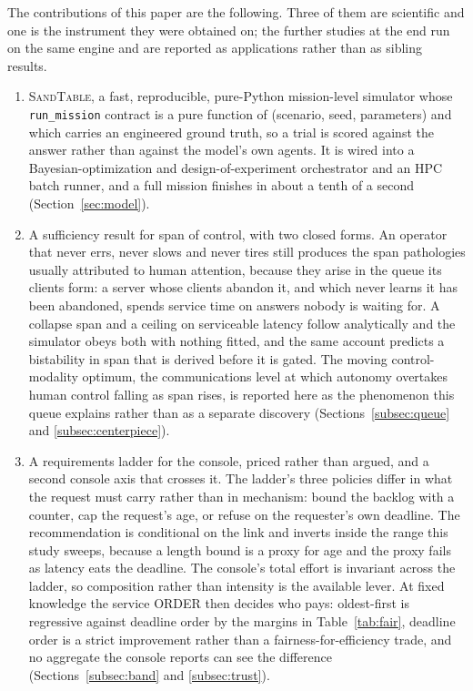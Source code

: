 \documentclass[11pt]{article}
\newcommand{\sandtable}{\textsc{SandTable}}
\begin{document}
The contributions of this paper are the following. Three of them are scientific and one is the
instrument they were obtained on; the further studies at the end run on the same engine and are
reported as applications rather than as sibling results.
\begin{enumerate}
\item \sandtable{}, a fast, reproducible, pure-Python mission-level simulator whose
\texttt{run\_mission} contract is a pure function of (scenario, seed, parameters) and which carries
an engineered ground truth, so a trial is scored against the answer rather than against the model's
own agents. It is wired into a Bayesian-optimization and design-of-experiment orchestrator and an
HPC batch runner, and a full mission finishes in about a tenth of a second
(Section~\ref{sec:model}).

\item A sufficiency result for span of control, with two closed forms. An operator that never errs,
never slows and never tires still produces the span pathologies usually attributed to human
attention, because they arise in the queue its clients form: a server whose clients abandon it, and
which never learns it has been abandoned, spends service time on answers nobody is waiting for. A
collapse span and a ceiling on serviceable latency follow analytically and the simulator obeys both
with nothing fitted, and the same account predicts a bistability in span that is derived before it
is gated. The moving control-modality optimum, the communications level at which autonomy overtakes
human control falling as span rises, is reported here as the phenomenon this queue explains rather
than as a separate discovery (Sections~\ref{subsec:queue} and \ref{subsec:centerpiece}).

\item A requirements ladder for the console, priced rather than argued, and a second console axis
that crosses it. The ladder's three policies differ in what the request must carry rather than in
mechanism: bound the backlog with a counter, cap the request's age, or refuse on the requester's own
deadline. The recommendation is conditional on the link and inverts inside the range this study
sweeps, because a length bound is a proxy for age and the proxy fails as latency eats the deadline.
The console's total effort is invariant across the ladder, so composition rather than intensity is
the available lever. At fixed knowledge the service ORDER then decides who pays: oldest-first is
regressive against deadline order by the margins in Table~\ref{tab:fair}, deadline order is a strict
improvement rather than a fairness-for-efficiency trade, and no aggregate the console reports can
see the difference (Sections~\ref{subsec:band} and \ref{subsec:trust}).


\end{enumerate}
\end{document}
